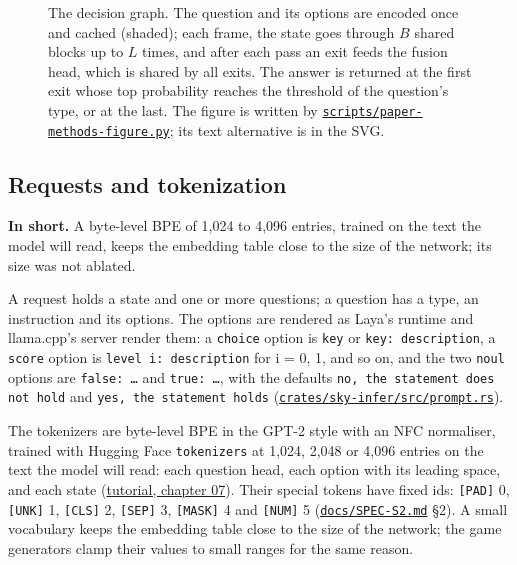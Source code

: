 \documentclass[10pt]{article}
\begin{document}
\begin{figure}[htbp]
\centering

\caption[The decision graph.]{The decision graph. The question and its options are encoded once and cached (shaded); each frame, the state goes through $B$ shared blocks up to $L$ times, and after each pass an exit feeds the fusion head, which is shared by all exits. The answer is returned at the first exit whose top probability reaches the threshold of the question's type, or at the last. The figure is written by \href{https://github.com/maxgfr/skycmd/blob/main/scripts/paper-methods-figure.py}{\texttt{scripts/\allowbreak{}paper-methods-figure.py}}; its text alternative is in the SVG.}\label{fig:1}
\end{figure}



\subsection{Requests and tokenization}\label{sec:3.1}

\textbf{In short.} A byte-level BPE of 1,024 to 4,096 entries, trained on the text the model will read, keeps the embedding table close to the size of the network; its size was not ablated.

A request holds a state and one or more questions; a question has a type, an instruction and its options. The options are rendered as Laya's runtime and llama.cpp's server render them: a \texttt{choice} option is \texttt{key} or \texttt{key: description}, a \texttt{score} option is \texttt{level i: description} for i = 0, 1, and so on, and the two \texttt{noul} options are \texttt{false: \ldots{}} and \texttt{true: \ldots{}}, with the defaults \texttt{no, the statement does not hold} and \texttt{yes, the statement holds} (\href{https://github.com/maxgfr/skycmd/blob/main/crates/sky-infer/src/prompt.rs}{\texttt{crates/\allowbreak{}sky-infer/\allowbreak{}src/\allowbreak{}prompt.rs}}).

The tokenizers are byte-level BPE in the GPT-2 style with an NFC normaliser, trained with Hugging Face \texttt{tokenizers} at 1,024, 2,048 or 4,096 entries on the text the model will read: each question head, each option with its leading space, and each state (\href{https://maxgfr.github.io/skycmd/tutorial/07-tokenizer}{tutorial, chapter 07}). Their special tokens have fixed ids: \texttt{[PAD]} 0, \texttt{[UNK]} 1, \texttt{[CLS]} 2, \texttt{[SEP]} 3, \texttt{[MASK]} 4 and \texttt{[NUM]} 5 (\href{https://github.com/maxgfr/skycmd/blob/main/docs/SPEC-S2.md}{\texttt{docs/\allowbreak{}SPEC-S2.md}} §2). A small vocabulary keeps the embedding table close to the size of the network; the game generators clamp their values to small ranges for the same reason.
\end{document}
